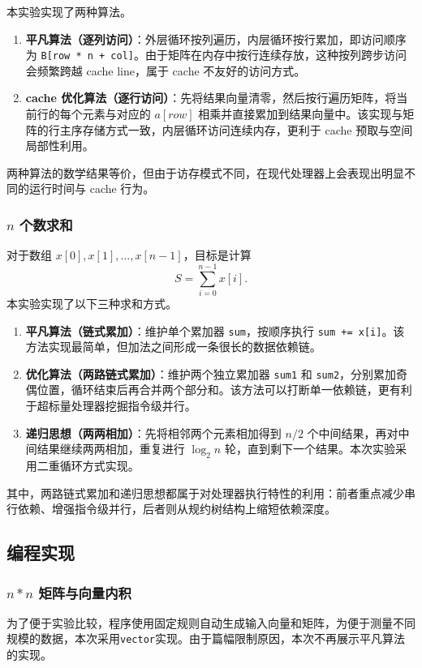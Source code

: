 ﻿\documentclass[UTF8,a4paper,12pt]{ctexart}
\begin{document}
本实验实现了两种算法。
\begin{enumerate}[label=\arabic*.]
    \item \textbf{平凡算法（逐列访问）}：外层循环按列遍历，内层循环按行累加，即访问顺序为 \texttt{B[row * n + col]}。由于矩阵在内存中按行连续存放，这种按列跨步访问会频繁跨越 cache line，属于 cache 不友好的访问方式。
    \item \textbf{cache 优化算法（逐行访问）}：先将结果向量清零，然后按行遍历矩阵，将当前行的每个元素与对应的 \(a[row]\) 相乘并直接累加到结果向量中。该实现与矩阵的行主序存储方式一致，内层循环访问连续内存，更利于 cache 预取与空间局部性利用。
\end{enumerate}

两种算法的数学结果等价，但由于访存模式不同，在现代处理器上会表现出明显不同的运行时间与 cache 行为。

\subsubsection{\(n\) 个数求和}
对于数组 \(x[0],x[1],\ldots,x[n-1]\)，目标是计算
\[
    S = \sum_{i=0}^{n-1} x[i].
\]
本实验实现了以下三种求和方式。
\begin{enumerate}[label=\arabic*.]
    \item \textbf{平凡算法（链式累加）}：维护单个累加器 \texttt{sum}，按顺序执行 \texttt{sum += x[i]}。该方法实现最简单，但加法之间形成一条很长的数据依赖链。
    \item \textbf{优化算法（两路链式累加）}：维护两个独立累加器 \texttt{sum1} 和 \texttt{sum2}，分别累加奇偶位置，循环结束后再合并两个部分和。该方法可以打断单一依赖链，更有利于超标量处理器挖掘指令级并行。
    \item \textbf{递归思想（两两相加）}：先将相邻两个元素相加得到 \(n/2\) 个中间结果，再对中间结果继续两两相加，重复进行 \(\log_2 n\) 轮，直到剩下一个结果。本次实验采用二重循环方式实现。
\end{enumerate}

其中，两路链式累加和递归思想都属于对处理器执行特性的利用：前者重点减少串行依赖、增强指令级并行，后者则从规约树结构上缩短依赖深度。
\subsection{编程实现}

\subsubsection{\(n*n\) 矩阵与向量内积}
为了便于实验比较，程序使用固定规则自动生成输入向量和矩阵，为便于测量不同规模的数据，本次采用\texttt{vector}实现。由于篇幅限制原因，本次不再展示平凡算法的实现。
\end{document}
